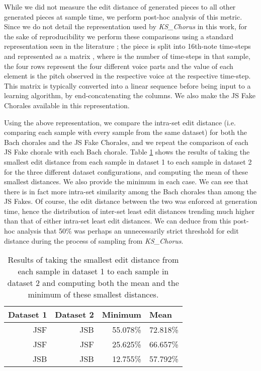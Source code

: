 \documentclass{article}
\begin{document}
While we did not measure the edit distance of generated pieces to all other generated pieces at sample time, we perform post-hoc analysis of this metric. Since we do not detail the representation used by \textit{KS\_Chorus} in this work, for the sake of reproducibility we perform these comparisons using a standard representation seen in the literature \cite{tonicnet, musictransformer}; the piece is split into 16th-note time-steps and represented as a matrix , where  is the number of time-steps in that sample, the four rows represent the four different voice parts and the value of each element is the pitch observed in the respective voice at the respective time-step. This matrix is typically converted into a linear sequence before being input to a learning algorithm, by end-concatenating the columns. We also make the JS Fake Chorales available in this representation.

Using the above representation, we compare the intra-set edit distance (i.e. comparing each sample with every sample from the same dataset) for both the Bach chorales and the JS Fake Chorales, and we repeat the comparison of each JS Fake chorale with each Bach chorale. Table \ref{tab:distance} shows the results of taking the smallest edit distance from each sample in dataset 1 to each sample in dataset 2 for the three different dataset configurations, and computing the mean of these smallest distances. We also provide the minimum in each case. We can see that there is in fact more intra-set similarity among the Bach chorales than among the JS Fakes. Of course, the edit distance between the two was enforced at generation time, hence the distribution of inter-set least edit distances trending much higher than that of either intra-set least edit distances. We can deduce from this post-hoc analysis that 50\% was perhaps an unnecessarily strict threshold for edit distance during the process of sampling from \textit{KS\_Chorus}.

\begin{table}
\centering
\caption{Results of taking the smallest edit distance from each sample in dataset 1 to each sample in dataset 2 and computing both the mean and the minimum of these smallest distances.\newline}
\label{tab:distance}
\begin{tabular}{rrrr}
\multicolumn{1}{l}{\textbf{Dataset 1}} & \multicolumn{1}{l}{\textbf{Dataset 2}} & \multicolumn{1}{l}{\textbf{Minimum}} & \multicolumn{1}{l}{\textbf{Mean}}  \\ 
\hline
JSF                                    & JSB                                    & 55.078\%                             & 72.818\%                           \\
JSF                                    & JSF                                    & 25.625\%                             & 66.657\%                           \\
JSB                                    & JSB                                    & 12.755\%                             & 57.792\%                          
\end{tabular}
\end{table}
\end{document}
